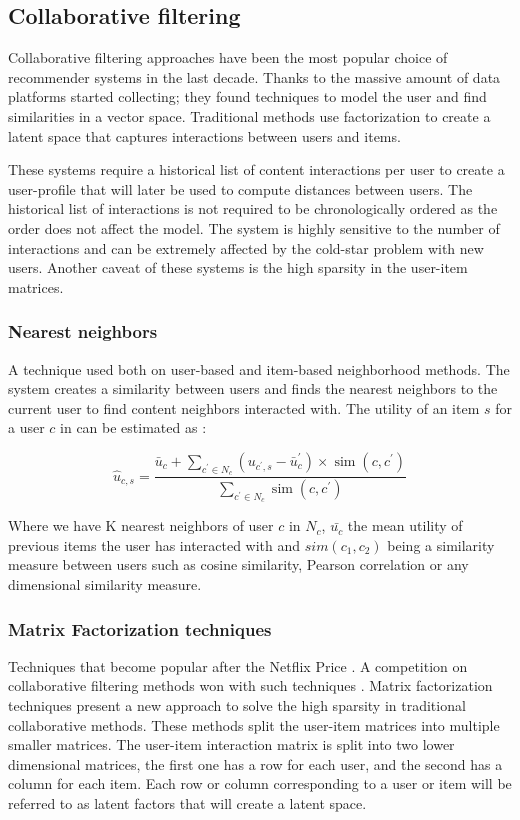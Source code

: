 \documentclass{kththesis}
\begin{document}
\subsection{Collaborative filtering}
Collaborative filtering approaches have been the most popular choice of recommender systems in the last decade. Thanks to the massive amount of data platforms started collecting; they found techniques to model the user and find similarities in a vector space. Traditional methods use factorization to create a latent space that captures interactions between users and items.

These systems require a historical list of content interactions per user to create a user-profile that will later be used to compute distances between users. The historical list of interactions is not required to be chronologically ordered as the order does not affect the model. The system is highly sensitive to the number of interactions and can be extremely affected by the cold-star problem with new users. Another caveat of these systems is the high sparsity in the user-item matrices.

\subsubsection{Nearest neighbors}
A technique used both on user-based and item-based neighborhood methods. The system creates a similarity between users and finds the nearest neighbors to the current user to find content neighbors interacted with. The utility of an item $s$ for a user $c$ in can be estimated as \cite{knn}:

\begin{equation}
\hat{u}_{c, s}=\frac{\bar{u}_{c}+\sum_{c^{\prime} \in N_{c}}\left(u_{c^{\prime}, s}-\bar{u}_{c}^{\prime}\right) \times \operatorname{sim}\left(c, c^{\prime}\right)}{\sum_{c^{\prime} \in N_{c}} \operatorname{sim}\left(c, c^{\prime}\right)}
\end{equation}

Where we have K nearest neighbors of user $c$ in $N_c$, $\bar{u_c}$ the mean utility of previous items the user has interacted with and $sim(c_1,c_2)$ being a similarity measure between users such as cosine similarity, Pearson correlation or any dimensional similarity measure.


\subsubsection{Matrix Factorization techniques} \label{als}
Techniques that become popular after the Netflix Price \cite{netflix}. A competition on collaborative filtering methods won with such techniques \cite{matrix}. Matrix factorization techniques present a new approach to solve the high sparsity in traditional collaborative methods. These methods split the user-item matrices into multiple smaller matrices. The user-item interaction matrix is split into two lower dimensional matrices, the first one has a row for each user, and the second has a column for each item. Each row or column corresponding to a user or item will be referred to as latent factors \cite{latentspace} that will create a latent space.
\end{document}
